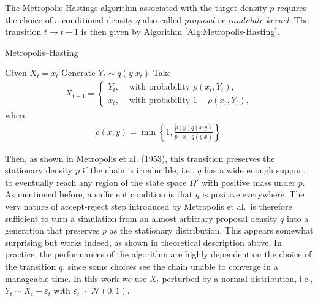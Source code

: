 \documentclass[11pt,a4paper]{article}
\numberwithin{equation}{section}
\begin{document}
The Metropolis-Hastings algorithm associated with the target density $p$ requires the choice of a conditional density $q$ also called {\it proposal} or {\it candidate kernel}.  
%
The transition $t\to t+1$ is then given by Algorithm \ref{Alg:Metropolis-Hasting}.
\begin{algorithm}
	\caption{Metropolis--Hasting}
	\label{Alg:Metropolis-Hasting}
	\begin{algorithmic}[1]
		\State Given $X_t = x_t$
		\State Generate $Y_t\sim q(y | x_t)$
		\State Take 
		\begin{align*}
		X_{t+1}=\left\lbrace 
		\begin{aligned}
		Y_t, &\text{ with probability } \rho(x_t,Y_t),\\
		x_t, &\text{ with probability } 1- \rho(x_t,Y_t),
		\end{aligned}
		\right.
		\end{align*}
		where 
		\begin{align*}
		\rho(x,y) = \min\left\lbrace 1, \frac{\tilde{p}(y)q(x|y)}{\tilde{p}(x)q(y|x)}\right\rbrace.
		\end{align*}
		\EndProcedure
	\end{algorithmic}
\end{algorithm}


Then, as shown in Metropolis et al. (1953), this transition preserves the stationary density $p$ if the chain is irreducible, i.e., $q$ has a wide enough support to eventually reach any region of the state space $\Omega'$ with positive mass under $p$. 
%
As mentioned before, a sufficient condition is that $q$ is positive everywhere. 
%
The very nature of accept-reject step introduced by Metropolis et al.~is therefore sufficient to turn a simulation from an almost arbitrary proposal density $q$ into a generation that preserves $p$ as the stationary distribution. 
%
This appears somewhat surprising but works indeed, as shown in theoretical description above.
%
In practice, the performances of the algorithm are highly dependent on the choice of the transition $q$, since some choices see the chain unable to converge in a manageable time.
%
In this work we use $X_t$ perturbed by a normal distribution, i.e., $Y_t\sim X_t+\varepsilon_t$ with $\varepsilon_t\sim \mathcal{N}(0,1)$.
\end{document}
